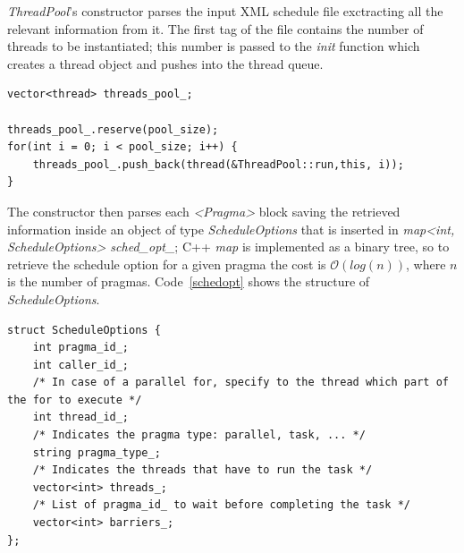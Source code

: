 \documentclass[a4paper,11pt,oneside]{book}
\begin{document}
\emph{ThreadPool}’s constructor parses the input XML schedule file exctracting all the relevant information from it. The first tag of the file contains the number of threads to be instantiated; this number is passed to the \emph{init} function which creates a thread object and pushes into the thread queue.

\begin{lstlisting}[language=CCC, caption=Initialization of the thread pool., label=pool]
vector<thread> threads_pool_;

threads_pool_.reserve(pool_size);
for(int i = 0; i < pool_size; i++) {
    threads_pool_.push_back(thread(&ThreadPool::run,this, i));
}
\end{lstlisting}

The constructor then parses each \emph{<Pragma>} block saving the retrieved information inside an object of type \emph{ScheduleOptions} that is inserted in \emph{map<int, ScheduleOptions> sched\_opt\_}; C++ \emph{map} is implemented as a binary tree, so to retrieve the schedule option for a given pragma the cost is $\mathcal{O}(log(n))$, where $n$ is the number of pragmas.  Code~\ref{schedopt} shows the structure of \emph{ScheduleOptions}.
\begin{lstlisting}[language=CCC, label=schedopt]
struct ScheduleOptions {
    int pragma_id_;
    int caller_id_;
    /* In case of a parallel for, specify to the thread which part of the for to execute */
    int thread_id_;
    /* Indicates the pragma type: parallel, task, ... */
    string pragma_type_;
    /* Indicates the threads that have to run the task */
    vector<int> threads_;
    /* List of pragma_id_ to wait before completing the task */
    vector<int> barriers_;
};
\end{lstlisting}
\end{document}
